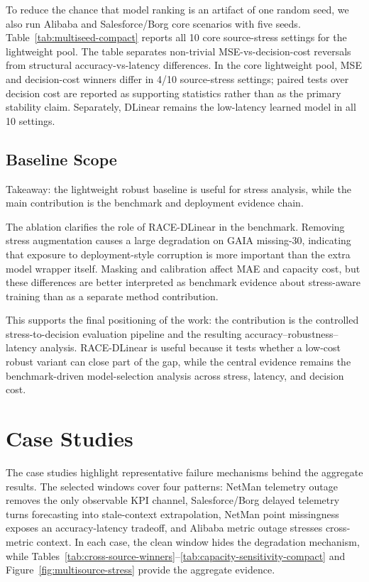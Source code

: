 \documentclass[conference]{IEEEtran}
\begin{document}
To reduce the chance that model ranking is an artifact of one random seed, we also run Alibaba and Salesforce/Borg core scenarios with five seeds. Table~\ref{tab:multiseed-compact} reports all 10 core source-stress settings for the lightweight pool. The table separates non-trivial MSE-vs-decision-cost reversals from structural accuracy-vs-latency differences. In the core lightweight pool, MSE and decision-cost winners differ in 4/10 source-stress settings; paired tests over decision cost are reported as supporting statistics rather than as the primary stability claim. Separately, DLinear remains the low-latency learned model in all 10 settings.



\subsection{Baseline Scope}

Takeaway: the lightweight robust baseline is useful for stress analysis, while the main contribution is the benchmark and deployment evidence chain.

The ablation clarifies the role of RACE-DLinear in the benchmark. Removing stress augmentation causes a large degradation on GAIA missing-30, indicating that exposure to deployment-style corruption is more important than the extra model wrapper itself. Masking and calibration affect MAE and capacity cost, but these differences are better interpreted as benchmark evidence about stress-aware training than as a separate method contribution.

This supports the final positioning of the work: the contribution is the controlled stress-to-decision evaluation pipeline and the resulting accuracy--robustness--latency analysis. RACE-DLinear is useful because it tests whether a low-cost robust variant can close part of the gap, while the central evidence remains the benchmark-driven model-selection analysis across stress, latency, and decision cost.

\section{Case Studies}

The case studies highlight representative failure mechanisms behind the aggregate results. The selected windows cover four patterns: NetMan telemetry outage removes the only observable KPI channel, Salesforce/Borg delayed telemetry turns forecasting into stale-context extrapolation, NetMan point missingness exposes an accuracy-latency tradeoff, and Alibaba metric outage stresses cross-metric context. In each case, the clean window hides the degradation mechanism, while Tables~\ref{tab:cross-source-winners}--\ref{tab:capacity-sensitivity-compact} and Figure~\ref{fig:multisource-stress} provide the aggregate evidence.
\end{document}
